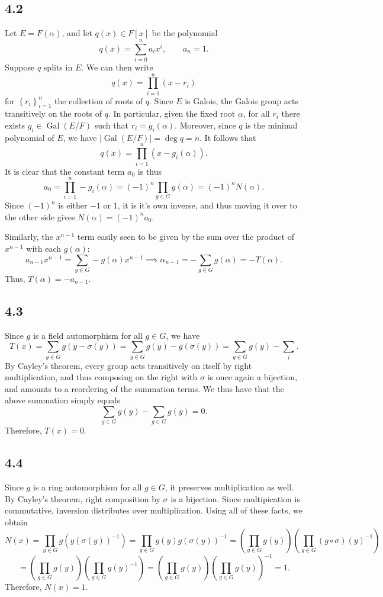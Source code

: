 \documentclass[11pt, letterpaper]{article}
\begin{document}
\subsection*{4.2}
Let $E=F(\alpha )$, and let $q(x)\in F[x]$ be the polynomial
\[
	q(x)=\sum_{i=0}^{n} a_ix^i,\qquad a_n=1
.\]
Suppose $q$ splits in $E$. We can then write
\[
	q(x)= \prod_{i=1}^{n} (x-r_i)
\]
for $\left\{ r_i \right\}_{i=1}^n$ the collection of roots of $q$. Since $E$ is Galois, the Galois group acts transitively on the roots of $q$. In particular, given the fixed root $\alpha $, for all $r_i$ there exists $g_i\in \operatorname{Gal} (E/F)$ such that $r_i=g_i(\alpha )$. Moreover, since $q$ is the minimal polynomial of $E$, we have $\left| \operatorname{Gal} (E/F) \right| =\operatorname{deg} q=n$. It follows that
\[
	q(x)=\prod_{i=1}^{n} (x-g_i(\alpha ))
.\]
It is clear that the constant term $a_0$ is thus
\[
	a_0 = \prod_{i=1}^{n} -g_i(\alpha )=(-1)^n \prod_{g\in G} g(\alpha )=(-1)^n N(\alpha )
.\]
Since $(-1)^n$ is either $-1$ or $1$, it is it's own inverse, and thus moving it over to the other side gives $N(\alpha )=(-1)^n a_0$.

Similarly, the $x^{n-1} $ term easily seen to be given by the sum over the product of $x^{n-1} $ with each $g(\alpha )$:
\[
	a_{n-1} x^{n-1} =\sum_{g\in G} -g(\alpha )x^{n-1} \implies \alpha _{n-1} =-\sum_{g\in G} g(\alpha )=-T(\alpha )
.\]
Thus, $T(\alpha )=-a_{n-1} $.

\subsection*{4.3}
Since $g$ is a field automorphism for all $g\in G$, we have
\[
	T(x)=\sum_{g\in G} g\left( y-\sigma (y) \right) =\sum_{g\in G} g(y)-g(\sigma (y))=\sum_{g\in G} g(y)-\sum_{i} 
.\]
By Cayley's theorem, every group acts transitively on itself by right multiplication, and thus composing on the right with $\sigma $ is once again a bijection, and amounts to a reordering of the summation terms. We thus have that the above summation simply equals
\[
	\sum_{g\in G} g(y)-\sum_{g\in G} g(y)=0
.\]
Therefore, $T(x)=0$.
\subsection*{4.4}

Since $g$ is a ring automorphism for all $g\in G$, it preserves multiplication as well. By Cayley's theorem, right composition by $\sigma $ is a bijection. Since multipication is commutative, inversion distributes over multiplication. Using all of these facts, we obtain
\[
	N(x)=\prod_{g\in G} g\left( y(\sigma (y))^{-1}  \right) =\prod_{g\in G} g(y)g(\sigma (y))^{-1}=\left( \prod_{g\in G} g(y) \right) \left( \prod_{g\in G} (g\circ \sigma )(y)^{-1}  \right) 
\]
\[
	=\left( \prod_{g\in G} g(y) \right) \left( \prod_{g\in G} g(y)^{-1}  \right) =\left( \prod_{g\in G} g(y) \right) \left( \prod_{g\in G} g(y) \right) ^{-1} =1
.\]
Therefore, $N(x)=1$.
\end{document}
